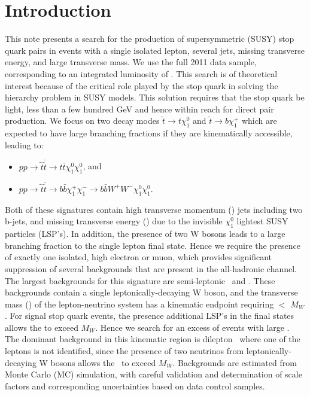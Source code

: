 \section{Introduction}
\label{ref:intro}

This note presents a search for the production of supersymmetric (SUSY) stop quark pairs in events with a 
single isolated lepton, several jets, missing transverse energy, and large transverse mass. We use the full 
2011 data sample, corresponding to an integrated luminosity of \lumi. 
This search is of theoretical interest because of the critical role played 
by the stop quark in solving the hierarchy problem in SUSY models. This solution requires that the stop quark 
be light, less than a few hundred GeV and hence within reach for direct pair production. We focus on two decay modes 
$\tilde{t}\rightarrow t\chi^0_1$ and $\tilde{t}\rightarrow b \chi^+_1$  which are expected
to have large branching fractions if they are kinematically accessible, leading to:

\begin{itemize}
\item $pp\rightarrow\tilde{t}\bar{\tilde{t}}\rightarrow t\bar{t}\chi^0_1\chi^0_1$, and
\item $pp\rightarrow\tilde{t}\bar{\tilde{t}}\rightarrow b\bar{b}\chi^+_1\chi^-_1 \rightarrow b\bar{b}W^+W^-\chi^0_1\chi^0_1$.
\end{itemize}

Both of these signatures contain high transverse momentum (\pt) jets including two b-jets, and missing transverse 
energy (\MET) due to the invisible $\chi^0_1$ lightest SUSY particles (LSP's). In addition, the presence of
two W bosons leads to a large branching fraction to the single lepton final state. Hence we require the presence
of exactly one isolated, high \pt electron or muon, which provides significant suppression of several backgrounds
that are present in the all-hadronic channel. The largest backgrounds for this signature are semi-leptonic \ttbar\
and \wjets. These backgrounds contain a single leptonically-decaying W boson, and the transverse mass (\mt)
of the lepton-neutrino system has a kinematic endpoint requiring \mt $<$ $M_W$. For signal stop quark events,
the presence additional LSP's in the final states allows the \mt to exceed $M_W$. Hence we search for an excess
of events with large \mt. The dominant background in this kinematic region is dilepton \ttbar\ where one of the
leptons is not identified, since the presence of two neutrinos from leptonically-decaying W bosons allows the 
\mt\ to exceed $M_W$. Backgrounds are estimated from Monte Carlo (MC) simulation, with careful validation 
and determination of scale factors and corresponding uncertainties based on data control samples.

